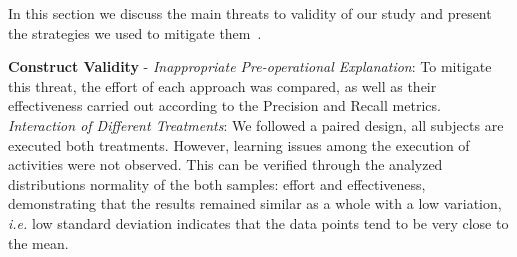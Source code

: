\documentclass[a4paper,twoside,anonymous]{article}
\begin{document}
In this section we discuss the main threats to validity of our study and present the strategies we used to mitigate them~\citep{Cook:1979}.

\textbf{Construct Validity} - 
\textit{Inappropriate Pre-operational Explanation}:
To mitigate this threat, the effort of each approach was compared, as well as their effectiveness carried out according to the Precision and Recall metrics. 
\textit{Interaction of Different Treatments}: 
We followed a paired design, all subjects are executed both treatments.
However, learning issues among the execution of activities were not observed.
This can be verified through the analyzed distributions normality of the both samples: effort and effectiveness, demonstrating that the results remained similar as a whole with a low variation, \textit{i.e.} low standard deviation indicates that the data points tend to be very close to the mean.
\end{document}
